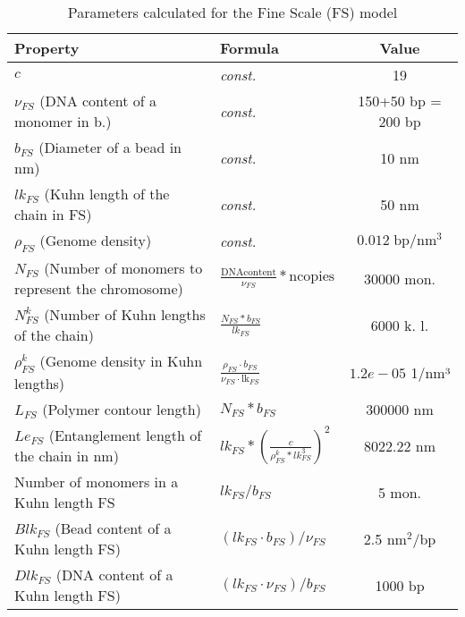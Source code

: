\begin{table}[H]

\begin{tabular}{|l|l|c|}
\hline
\textbf{Property} & \textbf{Formula} & \textbf{Value}\\
\hline
\textbf{$c$} & \textit{const.} & 19\\
\hline
\textbf{$\nu_{FS}$} (DNA content of a monomer in b.) & \textit{const.} & 150+50 bp = 200 bp\\
\hline
\textbf{$b_{FS}$} (Diameter of a bead in nm) & \textit{const.} & 10 nm\\
\hline
\textbf{$lk_{FS}$} (Kuhn length of the chain  in FS) & \textit{const.} & 50 nm \\
\hline
\textbf{$\rho_{FS}$} (Genome density) &\textit{const.} & $0.012\; \text{bp}/\text{nm}^3$ \\ %
\hline
\textbf{$N_{FS}$} (Number of monomers to represent the chromosome) & $\frac{\text{DNAcontent}}{\nu_{FS}} * \text{ncopies}$ & 30000 mon.\\
\hline
\textbf{$N^k_{FS}$} (Number of Kuhn lengths of the chain) & $\frac{N_{FS} * b_{FS}}{lk_{FS}}$ & 6000 k. l.\\
\hline
\textbf{$\rho^k_{FS}$} (Genome density in Kuhn lengths) & $\frac{\rho_{FS} \cdot b_{FS}}{\nu_{FS} \cdot \text{lk}_{FS}}$& $1.2e-05$ 1/nm³\\
\hline
\textbf{$L_{FS}$} (Polymer contour length) & $N_{FS} * b_{FS}$ & 300000 nm\\
\hline
\textbf{$Le_{FS}$} (Entanglement length of the chain in nm) & $lk_{FS} * \left(\frac{c}{\rho^k_{FS} * lk_{FS}^3}\right)^2$ & 8022.22 nm\\
\hline
Number of monomers in a Kuhn length FS & $lk_{FS}/b_{FS}$ & 5 mon.\\
\hline
$Blk_{FS}$ (Bead content of a Kuhn length FS) & $(lk_{FS} \cdot b_{FS})/\nu_{FS}$ & 2.5 $\text{nm}^2$/bp  \\
\hline
$Dlk_{FS}$ (DNA content of a Kuhn length FS) & $(lk_{FS} \cdot \nu_{FS})/b_{FS}$ & 1000 $\text{bp}$\\
\hline
\end{tabular}
\label{tab: parameters FS}
\caption{Parameters calculated for the Fine Scale (FS) model}
\end{table}


